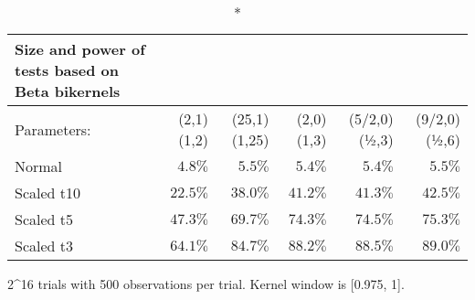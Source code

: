 \setlength{\LTpost}{0mm}
\begin{longtable}{lrrrrr}
\caption*{
{\large Size and power of tests based on Beta bikernels}
} \\ 
\toprule
Parameters: & (2,1)(1,2) & (25,1)(1,25) & (2,0)(1,3) & (5/2,0)(½,3) & (9/2,0)(½,6) \\ 
\midrule
Normal & $4.8\%$ & $5.5\%$ & $5.4\%$ & $5.4\%$ & $5.5\%$ \\ 
Scaled t10 & $22.5\%$ & $38.0\%$ & $41.2\%$ & $41.3\%$ & $42.5\%$ \\ 
Scaled t5 & $47.3\%$ & $69.7\%$ & $74.3\%$ & $74.5\%$ & $75.3\%$ \\ 
Scaled t3 & $64.1\%$ & $84.7\%$ & $88.2\%$ & $88.5\%$ & $89.0\%$ \\ 
\bottomrule
\end{longtable}
\begin{minipage}{\linewidth}
2\textasciicircum{}16 trials with 500 observations per trial.  Kernel window is [0.975, 1].\\
\end{minipage}


